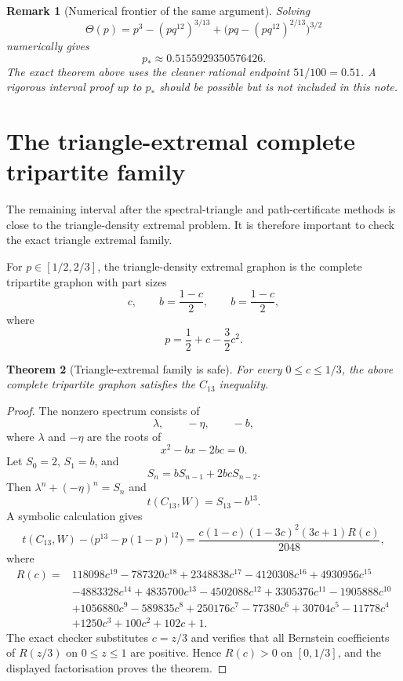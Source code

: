 \documentclass[11pt]{article}
\newtheorem{theorem}{Theorem}[section]
\newtheorem{remark}[theorem]{Remark}
\begin{document}
\begin{remark}[Numerical frontier of the same argument]
Solving
\[
        \Theta(p)=p^3-(pq^{12})^{3/13}+\bigl(pq-(pq^{12})^{2/13}\bigr)^{3/2}
\]
numerically gives
\[
        p_*\approx0.5155929350576426.
\]
The exact theorem above uses the cleaner rational endpoint $51/100=0.51$.
A rigorous interval proof up to $p_*$ should be possible but is not included in
this note.
\end{remark}

\section{The triangle-extremal complete tripartite family}\label{sec:triangle-extremal}

The remaining interval after the spectral-triangle and path-certificate methods
is close to the triangle-density extremal problem.  It is therefore important to
check the exact triangle extremal family.

For $p\in[1/2,2/3]$, the triangle-density extremal graphon is the complete
tripartite graphon with part sizes
\[
        c,
        \qquad b=\frac{1-c}{2},
        \qquad b=\frac{1-c}{2},
\]
where
\[
        p=\frac12+c-\frac32c^2.
\]

\begin{theorem}[Triangle-extremal family is safe]\label{thm:tripartite-safe}
For every $0\le c\le1/3$, the above complete tripartite graphon satisfies the
$C_{13}$ inequality.
\end{theorem}

\begin{proof}
The nonzero spectrum consists of
\[
        \lambda,
        \qquad -\eta,
        \qquad -b,
\]
where $\lambda$ and $-\eta$ are the roots of
\[
        x^2-bx-2bc=0.
\]
Let $S_0=2$, $S_1=b$, and
\[
        S_n=bS_{n-1}+2bcS_{n-2}.
\]
Then $\lambda^n+(-\eta)^n=S_n$ and
\[
        t(C_{13},W)=S_{13}-b^{13}.
\]
A symbolic calculation gives
\[
        t(C_{13},W)-\bigl(p^{13}-p(1-p)^{12}\bigr)
        =\frac{c(1-c)(1-3c)^2(3c+1)R(c)}{2048},
\]
where
\begin{align*}
R(c)={}&118098c^{19}-787320c^{18}+2348838c^{17}-4120308c^{16}
+4930956c^{15}\\
&-4883328c^{14}+4835700c^{13}-4502088c^{12}+3305376c^{11}
-1905888c^{10}\\
&+1056880c^9-589835c^8+250176c^7-77380c^6+30704c^5
-11778c^4\\
&+1250c^3+100c^2+102c+1.
\end{align*}
The exact checker substitutes $c=z/3$ and verifies that all Bernstein
coefficients of $R(z/3)$ on $0\le z\le1$ are positive.  Hence $R(c)>0$ on
$[0,1/3]$, and the displayed factorisation proves the theorem.
\end{proof}
\end{document}
